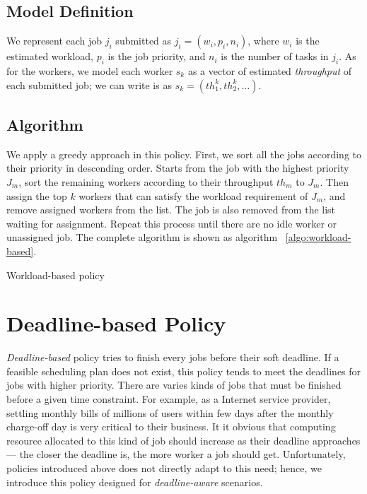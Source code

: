 \subsection{Model Definition}

We represent each job $j_i$ submitted as $j_i = (w_i, p_i, n_i)$, where
$w_i$ is the estimated workload, $p_i$ is the job priority, and $n_i$
is the number of tasks in $j_i$.
As for the workers, we model each worker $s_k$ as a vector of estimated
\emph{throughput} of each submitted job; we can write is as $s_k =
(th^k_1, th^k_2, \ldots)$.

\subsection{Algorithm}

We apply a greedy approach in this policy.
First, we sort all the jobs according to their priority in descending
order.
Starts from the job with the highest priority $J_m$, sort the remaining
workers according to their throughput $th_m$ to $J_m$.
Then assign the top $k$ workers that can satisfy the workload
requirement of $J_m$, and remove assigned workers from the list.
The job is also removed from the list waiting for assignment.
Repeat this process until there are no idle worker or unassigned job.
The complete algorithm is shown as algorithm ~\ref{algo:workload-based}.

\begin{algorithm}[htbp]

\caption{Workload-based policy}
\label{algo:workload-based}
\end{algorithm}


\section{Deadline-based Policy}

\emph{Deadline-based} policy tries to finish every jobs before their 
soft deadline.
If a feasible scheduling plan does not exist, this policy tends to meet
the deadlines for jobs with higher priority.
There are varies kinds of jobs that must be finished before a given 
time constraint.
For example, as a Internet service provider, settling monthly bills of
millions of users within few days after the monthly charge-off day is
very critical to their business.
It it obvious that computing resource allocated to this kind of job 
should increase as their deadline approaches --- the closer the 
deadline is, the more worker a job should get.
Unfortunately, policies introduced above does not directly adapt to 
this need; hence, we introduce this policy designed for
\emph{deadline-aware} scenarios.

